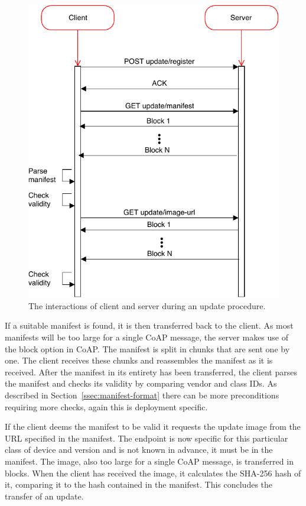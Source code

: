 \documentclass[0-thesis.tex]{subfiles}
\begin{document}

\begin{figure}
    \caption{The interactions of client and server during an update procedure.}
    \label{fig:client-server-interaction}
    \includegraphics{images/client-server-sequence.pdf}
\end{figure}

If a suitable manifest is found, it is then transferred back to the client. As most
manifests will be too large for a single CoAP message, the server makes use of the block
option in CoAP. The manifest is split in chunks that are sent one by one. The client
receives these chunks and reassembles the manifest as it is received. After the manifest
in its entirety has been transferred, the client parses the manifest and checks its
validity by comparing vendor and class IDs. As described in
Section~\ref{ssec:manifest-format} there can be more preconditions requiring more checks,
again this is deployment specific. 

If the client deems the manifest to be valid it requests the update image from the URL
specified in the manifest. The endpoint is now specific for this particular class of
device and version and is not known in advance, it must be in the manifest. The image,
also too large for a single CoAP message, is transferred in blocks. When the client has
received the image, it calculates the SHA-256 hash of it, comparing it to the hash
contained in the manifest. This concludes the transfer of an update.
\end{document}
